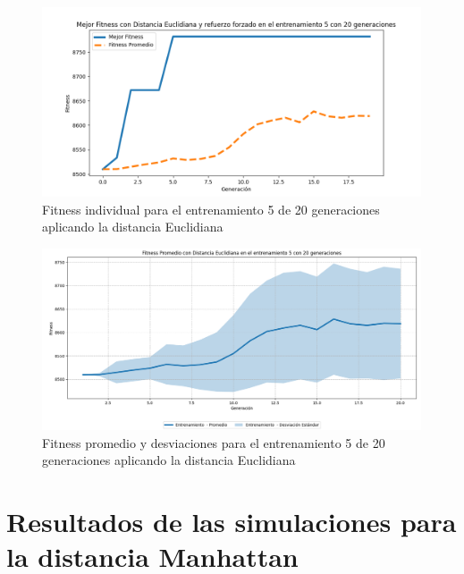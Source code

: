 \documentclass[conference]{IEEEtran}
\begin{document}
\begin{figure}[H]
    \centering
    \includegraphics[width=0.9 \linewidth]{Euclidiana/Fitness_individual_20/Fitness_5_Eucli_20Gen.png}
    \caption{Fitness individual para el entrenamiento 5 de 20 generaciones aplicando la distancia Euclidiana}
    \label{fig:eucli_5_20}
\end{figure}
\begin{figure}[H]
    \centering
    \includegraphics[width=0.9 \linewidth]{Euclidiana/Fitness_individual_20/Fitness_5_Eucli_20Gen_Sombra.png}
    \caption{Fitness promedio y desviaciones para el entrenamiento 5 de 20 generaciones aplicando la distancia Euclidiana}
    \label{fig:eucli_5_20_sombra}
\end{figure}

\section{Resultados de las simulaciones para la distancia Manhattan}
\end{document}
